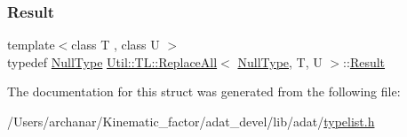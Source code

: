 \mbox{\label{structUtil_1_1TL_1_1ReplaceAll_3_01NullType_00_01T_00_01U_01_4_aa55fd49700fa3811cad906ae93201843}} 
\subsubsection{\texorpdfstring{Result}{Result}\hspace{0.1cm}{\footnotesize\ttfamily [2/2]}}
{\footnotesize\ttfamily template$<$class T , class U $>$ \\
typedef \mbox{\hyperlink{classUtil_1_1NullType}{Null\+Type}} \mbox{\hyperlink{structUtil_1_1TL_1_1ReplaceAll}{Util\+::\+T\+L\+::\+Replace\+All}}$<$ \mbox{\hyperlink{classUtil_1_1NullType}{Null\+Type}}, T, U $>$\+::\mbox{\hyperlink{structUtil_1_1TL_1_1ReplaceAll_3_01NullType_00_01T_00_01U_01_4_aa55fd49700fa3811cad906ae93201843}{Result}}}



The documentation for this struct was generated from the following file\+:\begin{DoxyCompactItemize}
\item 
/\+Users/archanar/\+Kinematic\+\_\+factor/adat\+\_\+devel/lib/adat/\mbox{\hyperlink{lib_2adat_2typelist_8h}{typelist.\+h}}\end{DoxyCompactItemize}
